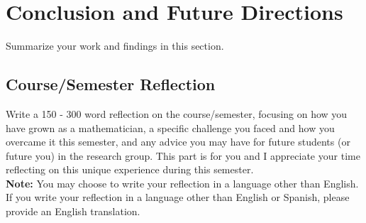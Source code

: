 \section{Conclusion and Future Directions}

Summarize your work and findings in this section.


\subsection{Course/Semester Reflection}

Write a 150 - 300 word reflection on the course/semester, focusing on how you have grown as a mathematician, a specific challenge you faced and how you overcame it this semester, and any advice you may have for future students (or future you) in the research group. This part is for you and I appreciate your time reflecting on this unique experience during this semester.\\

{\bf Note:} You may choose to write your reflection in a language other than English. If you write your reflection in a language other than English or Spanish, please provide an English translation.
